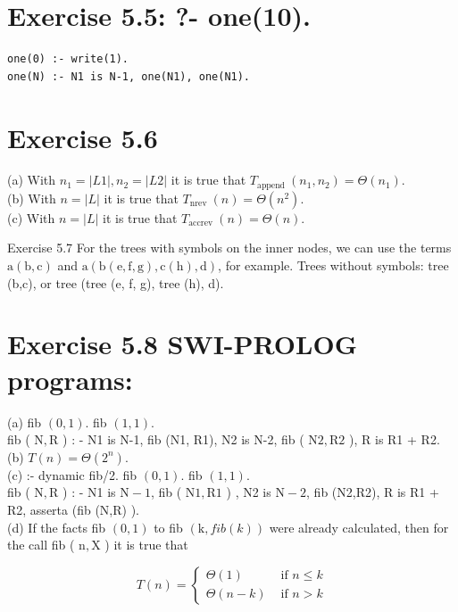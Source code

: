 \documentclass[10pt]{book}
\begin{document}
\section{Exercise 5.5: ?- one(10).}
\begin{verbatim}
one(0) :- write(1).
one(N) :- N1 is N-1, one(N1), one(N1).
\end{verbatim}

\section{Exercise 5.6}
(a) With $n_{1}=|L 1|, n_{2}=|L 2|$ it is true that $T_{\text {append }}\left(n_{1}, n_{2}\right)=\Theta\left(n_{1}\right)$.\\
(b) With $n=|L|$ it is true that $T_{\text {nrev }}(n)=\Theta\left(n^{2}\right)$.\\
(c) With $n=|L|$ it is true that $T_{\text {accrev }}(n)=\Theta(n)$.

Exercise 5.7 For the trees with symbols on the inner nodes, we can use the terms $\mathrm{a}(\mathrm{b}, \mathrm{c})$ and $\mathrm{a}(\mathrm{b}(\mathrm{e}, \mathrm{f}, \mathrm{g}), \mathrm{c}(\mathrm{h}), \mathrm{d})$, for example. Trees without symbols: tree (b,c), or tree (tree (e, f, g), tree (h), d).

\section{Exercise 5.8 SWI-PROLOG programs:}
(a) fib $(0,1)$. fib $(1,1)$.\\
fib ( $\mathrm{N}, \mathrm{R}$ ) : - N1 is N-1, fib (N1, R1), N2 is N-2, fib ( $\mathrm{N} 2, \mathrm{R} 2$ ), R is R1 + R2.\\
(b) $T(n)=\Theta\left(2^{n}\right)$.\\
(c) :- dynamic fib/2. fib $(0,1)$. fib $(1,1)$.\\
fib ( $\mathrm{N}, \mathrm{R}$ ) : - N1 is $\mathrm{N}-1$, fib ( $\mathrm{N} 1, \mathrm{R} 1$ ) , N2 is $\mathrm{N}-2$, fib (N2,R2), R is R1 + R2, asserta (fib (N,R) ).\\
(d) If the facts fib $(0,1)$ to fib $(\mathrm{k}, f i b(k))$ were already calculated, then for the call fib ( $\mathrm{n}, \mathrm{X}$ ) it is true that

$$
T(n)= \begin{cases}\Theta(1) & \text { if } n \leq k \\ \Theta(n-k) & \text { if } n>k\end{cases}
$$
\end{document}
